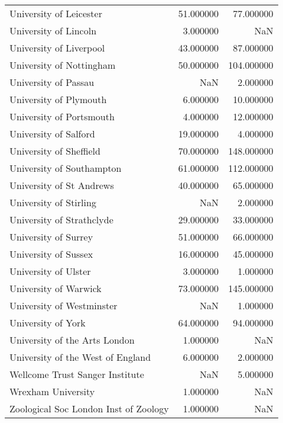 \begin{tabular}{lrr}
University of Leicester & 51.000000 & 77.000000 \\
University of Lincoln & 3.000000 & NaN \\
University of Liverpool & 43.000000 & 87.000000 \\
University of Nottingham & 50.000000 & 104.000000 \\
University of Passau & NaN & 2.000000 \\
University of Plymouth & 6.000000 & 10.000000 \\
University of Portsmouth & 4.000000 & 12.000000 \\
University of Salford & 19.000000 & 4.000000 \\
University of Sheffield & 70.000000 & 148.000000 \\
University of Southampton & 61.000000 & 112.000000 \\
University of St Andrews & 40.000000 & 65.000000 \\
University of Stirling & NaN & 2.000000 \\
University of Strathclyde & 29.000000 & 33.000000 \\
University of Surrey & 51.000000 & 66.000000 \\
University of Sussex & 16.000000 & 45.000000 \\
University of Ulster & 3.000000 & 1.000000 \\
University of Warwick & 73.000000 & 145.000000 \\
University of Westminster & NaN & 1.000000 \\
University of York & 64.000000 & 94.000000 \\
University of the Arts London & 1.000000 & NaN \\
University of the West of England & 6.000000 & 2.000000 \\
Wellcome Trust Sanger Institute & NaN & 5.000000 \\
Wrexham University & 1.000000 & NaN \\
Zoological Soc London Inst of Zoology & 1.000000 & NaN \\
\bottomrule
\end{tabular}
